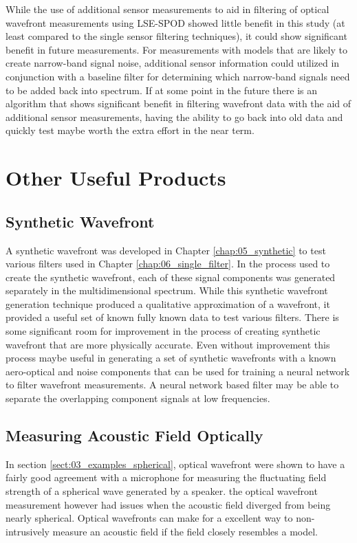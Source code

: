 While the use of additional sensor measurements to aid in filtering of optical wavefront measurements using LSE-SPOD showed little benefit in this study (at least compared to the single sensor filtering techniques), it could show significant benefit in future measurements.
For measurements with models that are likely to create narrow-band signal noise, additional sensor information could utilized in conjunction with a baseline filter for determining which narrow-band signals need to be added back into spectrum.
If at some point in the future there is an algorithm that shows significant benefit in filtering wavefront data with the aid of additional sensor measurements, having the ability to go back into old data and quickly test maybe worth the extra effort in the near term.

\section{Other Useful Products}

\subsection{Synthetic Wavefront}
A synthetic wavefront was developed in Chapter \ref{chap:05_synthetic} to test various filters used in Chapter \ref{chap:06_single_filter}.
In the process used to create the synthetic wavefront, each of these signal components was generated separately in the multidimensional spectrum.
While this synthetic wavefront generation technique produced a qualitative approximation of a wavefront, it provided a useful set of known fully known data to test various filters.
There is some significant room for improvement in the process of creating synthetic wavefront that are more physically accurate.
Even without improvement this process maybe useful in generating a set of synthetic wavefronts with a known aero-optical and noise components that can be used for training a neural network to filter \cite{Lo-1994-W6aWeuaT} wavefront measurements.
A neural network based filter may be able to separate the overlapping component signals at low frequencies.

\subsection{Measuring Acoustic Field Optically}
In section \ref{sect:03_examples_spherical}, optical wavefront were shown to have a fairly good agreement with a microphone for measuring the fluctuating field strength of a spherical wave generated by a speaker.
the optical wavefront measurement however had issues when the acoustic field diverged from being nearly spherical.
Optical wavefronts can make for a excellent way to non-intrusively measure an acoustic field if the field closely resembles a model.

